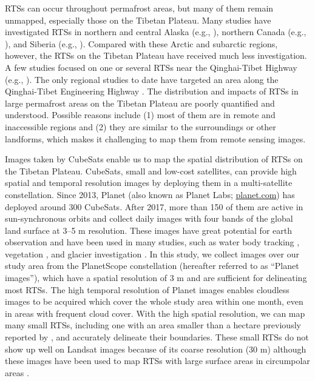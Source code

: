 \documentclass[authoryear,preprint,review,12pt]{elsarticle}
\begin{document}
RTSs can occur throughout permafrost areas, but many of them remain unmapped, especially those on the Tibetan Plateau. Many studies have investigated RTSs in northern and central Alaska (e.g., \citealp{swanson2018growth,balser2014timing}), northern Canada (e.g., \citealp{burn1990canadian, cassidy2017impacts, armstrong2018thaw,lewkowicz2019extremes}), and Siberia (e.g., \citealp{leibman2003dynamics, zwieback2018sub}). %
Compared with these Arctic and subarctic regions, however, the RTSs on the Tibetan Plateau have received much less investigation. 
A few studies focused on one or several RTSs near the Qinghai-Tibet Highway (e.g., \citealp{wang1995situ,sun2017creep}). The only regional studies to date have targeted an area along the Qinghai-Tibet Engineering Highway \citep{niu2014thaw, niu2016thaw,luo2019recent}. 
The distribution and impacts of RTSs in large permafrost areas on the Tibetan Plateau are poorly quantified and understood. 
Possible reasons include (1) most of them are in remote and inaccessible regions and (2) they are similar to the surroundings or other landforms, which makes it challenging to map them from remote sensing images.

Images taken by CubeSats enable us to map the spatial distribution of RTSs on the Tibetan Plateau. CubeSats, small and low-cost satellites, can provide high spatial and temporal resolution images by deploying them in a multi-satellite constellation. Since 2013, Planet (also known as Planet Labs; \url{planet.com}) has deployed around 300 CubeSats. After 2017, more than 150 of them are active in sun-synchronous orbits and collect daily images with four bands of the global land surface at 3--5 m resolution. These images have great potential for earth observation and have been used in many studies, such as water body tracking \citep{cooley2017tracking, cooley2019arctic, aragon2018cubesats, miles2018glacial}, vegetation \citep{houborg2016high, houborg2018daily}, and glacier investigation \citep{altena2017glacier}. In this study, we collect images over our study area from the PlanetScope constellation (hereafter referred to as “Planet images”), which have a spatial resolution of 3 m and are sufficient for delineating most RTSs. The high temporal resolution of Planet images enables cloudless images to be acquired which cover the whole study area within one month, even in areas with frequent cloud cover. With the high spatial resolution, we can map many small RTSs, including one with an area smaller than a hectare previously reported by \cite{niu2012development,niu2016thaw}, and accurately delineate their boundaries. These small RTSs do not show up well on Landsat images because of its coarse resolution (30 m) although these images have been used to map RTSs with large surface areas in circumpolar areas \citep{lacelle_distribution_2015, brooker2014mapping, nitze2018remote}. %
\end{document}
